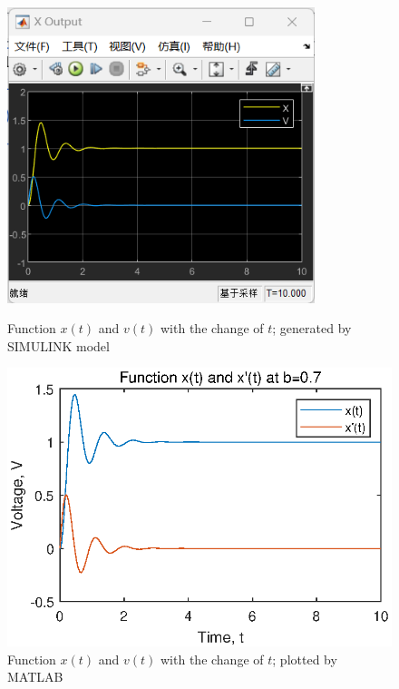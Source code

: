 \begin{figure}[h!]
  \begin{minipage}{0.45\linewidth}
    \centering
    \includegraphics[width=0.8\textwidth]{pics/ex1-b0.7.png}
    \caption{Function $x(t)$ and $v(t)$ with the change of $t$; generated by 
            SIMULINK model}
    \label{pic-b0.7}
  \end{minipage}
  \begin{minipage}{0.45\linewidth}
    \centering
    \includegraphics[scale=0.7]{pics/ex1-b0.7-plot.eps}
    \caption{Function $x(t)$ and $v(t)$ with the change of $t$; plotted by 
            MATLAB}
    \label{pic-b0.7_2}
    
  \end{minipage}
  
\end{figure}

